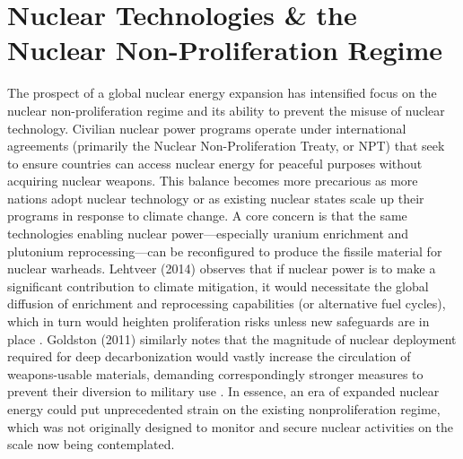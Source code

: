 \documentclass[11,5 pt]{article}
\begin{document}
\section{Nuclear Technologies \& the Nuclear Non-Proliferation Regime}


The prospect of a global nuclear energy expansion has intensified focus on the nuclear non-proliferation regime and its ability to prevent the misuse of nuclear technology. Civilian nuclear power programs operate under international agreements (primarily the Nuclear Non-Proliferation Treaty, or NPT) that seek to ensure countries can access nuclear energy for peaceful purposes without acquiring nuclear weapons. This balance becomes more precarious as more nations adopt nuclear technology or as existing nuclear states scale up their programs in response to climate change. A core concern is that the same technologies enabling nuclear power—especially uranium enrichment and plutonium reprocessing—can be reconfigured to produce the fissile material for nuclear warheads. Lehtveer (2014) observes that if nuclear power is to make a significant contribution to climate mitigation, it would necessitate the global diffusion of enrichment and reprocessing capabilities (or alternative fuel cycles), which in turn would heighten proliferation risks unless new safeguards are in place \cite{doi:10.1080/13669877.2014.889194}. Goldston (2011) similarly notes that the magnitude of nuclear deployment required for deep decarbonization would vastly increase the circulation of weapons-usable materials, demanding correspondingly stronger measures to prevent their diversion to military use \cite{Goldston}. In essence, an era of expanded nuclear energy could put unprecedented strain on the existing nonproliferation regime, which was not originally designed to monitor and secure nuclear activities on the scale now being contemplated.
\end{document}
